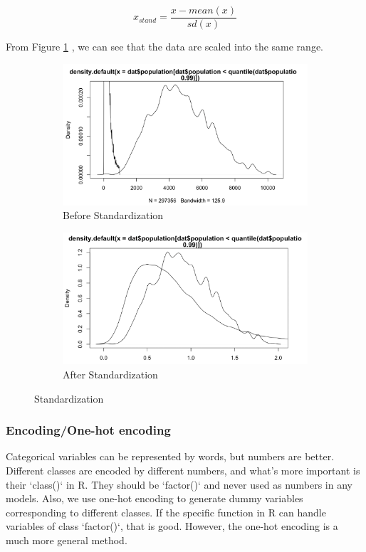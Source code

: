\documentclass{jpp}
\begin{document}
$$x_{stand} = \frac{x-mean(x)}{sd(x)}$$

From Figure \ref{scale} , we can see that the data are scaled into the same range.

\begin{figure}
\begin{subfigure}{.5\textwidth}
  \centering
  \includegraphics[width=.9\linewidth]{before_scale.png}  
  \caption{Before Standardization}
\end{subfigure}
\begin{subfigure}{.5\textwidth}
  \centering
  \includegraphics[width=.9\linewidth]{after_scale.png}  
  \caption{After Standardization}
\end{subfigure}
\caption{Standardization}
\label{scale}
\end{figure}


\subsubsection{Encoding/One-hot encoding}

Categorical variables can be represented by words, but numbers are better. Different classes are encoded by different numbers, and what’s more important is their `class()` in R. They should be `factor()` and never used as numbers in any models. Also, we use one-hot encoding to generate dummy variables corresponding to different classes. If the specific function in R can handle variables of class `factor()`, that is good. However, the one-hot encoding is a much more general method. 
\end{document}
